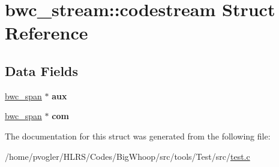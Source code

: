 \hypertarget{structbwc__stream_1_1codestream}{}\section{bwc\+\_\+stream\+:\+:codestream Struct Reference}
\label{structbwc__stream_1_1codestream}
\subsection*{Data Fields}
\begin{DoxyCompactItemize}
\item 
\mbox{\label{structbwc__stream_1_1codestream_a2af8df6a64246d3d7a7274afc7b6ba53}} 
\mbox{\hyperlink{structbwc__span}{bwc\+\_\+span}} $\ast$ {\bfseries aux}
\item 
\mbox{\label{structbwc__stream_1_1codestream_a3e2ad4383e3ae1367f4ee550b7a0e16b}} 
\mbox{\hyperlink{structbwc__span}{bwc\+\_\+span}} $\ast$ {\bfseries com}
\end{DoxyCompactItemize}


The documentation for this struct was generated from the following file\+:\begin{DoxyCompactItemize}
\item 
/home/pvogler/\+H\+L\+R\+S/\+Codes/\+Big\+Whoop/src/tools/\+Test/src/\mbox{\hyperlink{test_8c}{test.\+c}}\end{DoxyCompactItemize}
